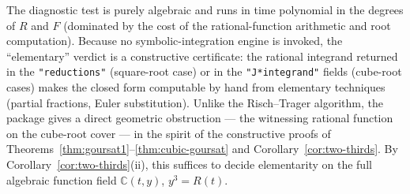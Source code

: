 \documentclass[11pt,a4paper]{article}
\theoremstyle{plain}
\theoremstyle{definition}
\theoremstyle{remark}
\newcommand{\C}{\mathbb{C}}
\begin{document}
\medskip
\noindent
The diagnostic test is purely algebraic and runs in time polynomial in the degrees of $R$ and $F$ (dominated by the cost of the rational-function arithmetic and root computation). Because no symbolic-integration engine is invoked, the ``elementary'' verdict is a constructive certificate: the rational integrand returned in the \texttt{"reductions"} (square-root case) or in the \texttt{"J*integrand"} fields (cube-root cases) makes the closed form computable by hand from elementary techniques (partial fractions, Euler substitution). Unlike the Risch--Trager algorithm, the package gives a direct geometric obstruction --- the witnessing rational function on the cube-root cover --- in the spirit of the constructive proofs of Theorems~\ref{thm:goursat1}--\ref{thm:cubic-goursat} and Corollary~\ref{cor:two-thirds}. By Corollary~\ref{cor:two-thirds}(ii), this suffices to decide elementarity on the full algebraic function field $\C(t,y)$, $y^3=R(t)$.
\end{document}
